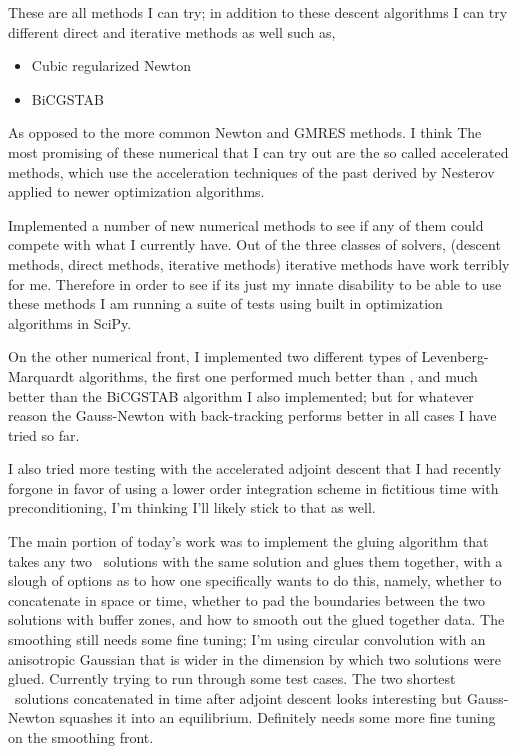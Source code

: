 \begin{itemize}
These are all methods I can try; in addition to these descent
algorithms I can try different direct and iterative methods as well such as,

\begin{itemize}
\item Cubic regularized Newton
\item BiCGSTAB
\end{itemize}

As opposed to the more common Newton and GMRES methods. I think
The most promising of these numerical that I can try out are the
so called accelerated methods, which use the acceleration techniques
of the past derived by Nesterov
applied to newer optimization algorithms.

Implemented a number of new numerical methods to see if any of them could
compete with what I currently have. Out of the three classes of solvers,
(descent methods, direct methods, iterative methods) iterative methods
have work terribly for me. Therefore in order to see if its just my innate
disability to be able to use these methods I am running a suite of tests
using built in optimization algorithms in SciPy.

On the other numerical front, I implemented two different types of Levenberg-Marquardt
algorithms, the first one performed much better than ,
and much better than the BiCGSTAB algorithm I also implemented; but for whatever
reason the Gauss-Newton with back-tracking performs better in all cases I have tried
so far.

I also tried more testing with the accelerated adjoint descent that I had recently forgone
in favor of using a lower order integration scheme in fictitious time with preconditioning,
I'm thinking I'll likely stick to that as well.

The main portion of today's work was to implement the gluing algorithm that takes any
two \twot\ solutions with the same solution and glues them together, with a slough of
options as to how one specifically wants to do this, namely, whether to concatenate in
space or time, whether to pad the boundaries between the two solutions with buffer
zones, and how to smooth out the glued together data. The smoothing still needs some fine
tuning; I'm using circular convolution with an anisotropic Gaussian that is wider in the
dimension by which two solutions were glued. Currently trying to run through some test
cases. The two shortest \ppo\ solutions concatenated in time after adjoint descent
looks interesting but Gauss-Newton squashes it into an equilibrium. Definitely needs
some more fine tuning on the smoothing front.


\end{itemize}
